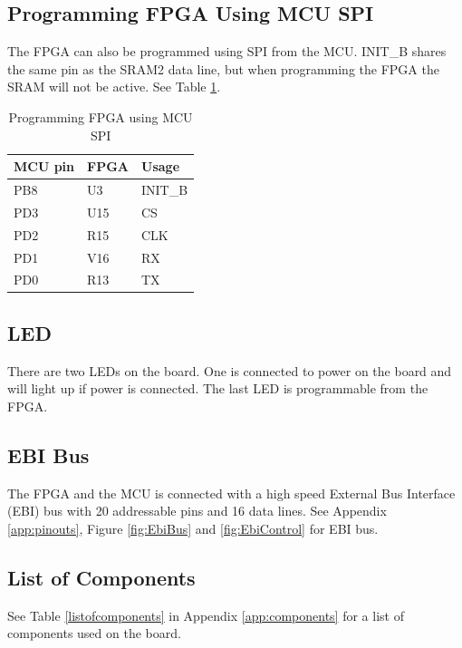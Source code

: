 \subsection{Programming FPGA Using MCU SPI}
The FPGA can also be programmed using SPI from the MCU.
INIT\_B shares the same pin as the SRAM2 data line, but when programming the FPGA the SRAM will not be active.
See Table \ref{tab:SpiProgrammer}.

\begin{table}[]
    \centering
    \begin{tabular}{lll}
        MCU pin & FPGA & Usage   \\
        \hline
        PB8     & U3   & INIT\_B \\
        PD3     & U15  & CS      \\
        PD2     & R15  & CLK     \\
        PD1     & V16  & RX      \\
        PD0     & R13  & TX
    \end{tabular}
    \caption{Programming FPGA using MCU SPI}
    \label{tab:SpiProgrammer}
\end{table}

\subsection{LED}
There are two LEDs on the board.
One is connected to power on the board and will light up if power is connected.
The last LED is programmable from the FPGA.

\subsection{EBI Bus}
The FPGA and the MCU is connected with a high speed External Bus Interface (EBI) bus with 20 addressable pins and 16 data lines.
See Appendix \ref{app:pinouts}, Figure \ref{fig:EbiBus} and \ref{fig:EbiControl} for EBI bus.

\subsection{List of Components}
See Table \ref{listofcomponents} in Appendix \ref{app:components} for a list of components used on the board.
